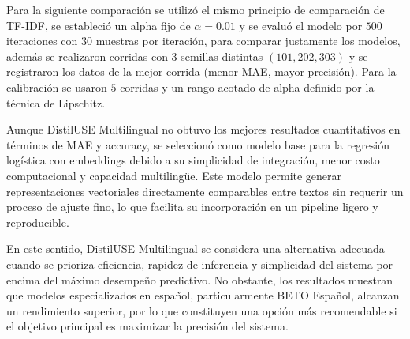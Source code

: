 \documentclass[12pt]{article}
\begin{document}
Para la siguiente comparación se utilizó el mismo principio de comparación de TF-IDF, se estableció un alpha fijo de $\alpha = 0.01$ y se evaluó el modelo por $500$ iteraciones con 30 muestras por iteración, para comparar justamente los modelos, además se realizaron corridas con $3$ semillas distintas $(101, 202, 303)$ y se registraron los datos de la mejor corrida (menor MAE, mayor precisión). Para la calibración se usaron $5$ corridas y un rango acotado de alpha definido por la técnica de Lipschitz.
\begin{table}[H]
\centering
\label{tab:resultados_embeddings}
\caption{Resultados de regresión logística con vectores empotrados}
\end{table}

Aunque DistilUSE Multilingual no obtuvo los mejores resultados cuantitativos en términos de MAE y accuracy, se seleccionó como modelo base para la regresión logística con embeddings debido a su simplicidad de integración, menor costo computacional y capacidad multilingüe. Este modelo permite generar representaciones vectoriales directamente comparables entre textos sin requerir un proceso de ajuste fino, lo que facilita su incorporación en un pipeline ligero y reproducible.

En este sentido, DistilUSE Multilingual se considera una alternativa adecuada cuando se prioriza eficiencia, rapidez de inferencia y simplicidad del sistema por encima del máximo desempeño predictivo. No obstante, los resultados muestran que modelos especializados en español, particularmente BETO Español, alcanzan un rendimiento superior, por lo que constituyen una opción más recomendable si el objetivo principal es maximizar la precisión del sistema.
\end{document}
